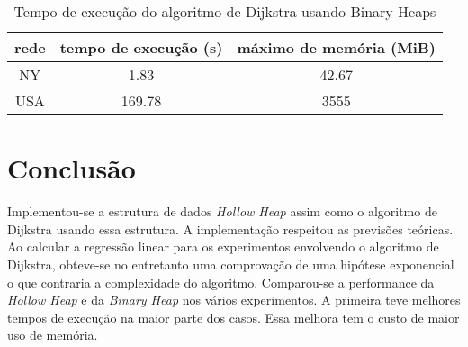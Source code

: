 \documentclass{iiufrgs}
\begin{document}
\begin{table}[H]
\centering
 \begin{tabular}{c | c c}
    rede & tempo de execução (s) & máximo de memória (MiB) \\
    \hline
    NY	    & 1.83 & 42.67  \\
    USA     & 169.78 & 3555  \\
 \end{tabular}
 \label{tab:nary}
  \caption{Tempo de execução do algoritmo de Dijkstra usando Binary Heaps}
\end{table}




\section{Conclus\~ao}
Implementou-se a estrutura de dados \textit{Hollow Heap} assim como o algoritmo de Dijkstra usando essa estrutura. A implementação respeitou as previsões teóricas.
Ao calcular a regressão linear para os experimentos envolvendo o algoritmo de Dijkstra, obteve-se no entretanto uma comprovação de uma hipótese exponencial o que contraria
a complexidade do algoritmo. Comparou-se a performance da \textit{Hollow Heap} e da \textit{Binary Heap} nos vários experimentos. A primeira teve melhores tempos de execução
na maior parte dos casos. Essa melhora tem o custo de maior uso de memória.
\end{document}
